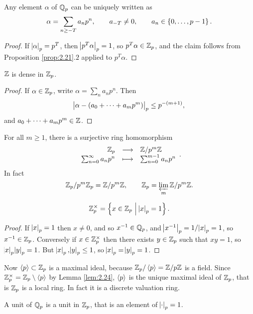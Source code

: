 \begin{corollary}
Any element $ \alpha $ of $ \mathbb{Q}_p $ can be uniquely written as
$$ \alpha = \sum_{n \ge -T} a_np^n, \qquad a_{-T} \ne 0, \qquad a_n \in \cbr{0, \dots, p - 1}. $$
\end{corollary}

\begin{proof}
If $ \abs{\alpha}_p = p^T $, then $ \abs{p^T\alpha}_p = 1 $, so $ p^T\alpha \in \mathbb{Z}_p $, and the claim follows from Proposition \ref{prop:2.21}.$ 2 $ applied to $ p^T\alpha $.
\end{proof}

\begin{corollary}
$ \mathbb{Z} $ is dense in $ \mathbb{Z}_p $.
\end{corollary}

\begin{proof}
If $ \alpha \in \mathbb{Z}_p $, write $ \alpha = \sum_n a_np^n $. Then
$$ \abs{\alpha - \br{a_0 + \dots + a_mp^m}}_p \le p^{-\br{m + 1}}, $$
and $ a_0 + \dots + a_mp^m \in \mathbb{Z} $.
\end{proof}

\pagebreak

For all $ m \ge 1 $, there is a surjective ring homomorphism
$$ \function{\ZZ_p}{\ZZ / p^m\ZZ}{\sum_{n = 0}^\infty a_np^n}{\sum_{n = 0}^{m - 1} a_np^n}. $$
In fact
$$ \mathbb{Z}_p / p^m\mathbb{Z}_p = \mathbb{Z} / p^m\mathbb{Z}, \qquad \mathbb{Z}_p = \varprojlim_m \mathbb{Z} / p^m\mathbb{Z}. $$

\begin{lemma}
\label{lem:2.24}
$$ \ZZ_p^\times = \cbr{x \in \ZZ_p \st \abs{x}_p = 1}. $$
\end{lemma}

\begin{proof}
If $ \abs{x}_p = 1 $ then $ x \ne 0 $, and so $ x^{-1} \in \mathbb{Q}_p $, and $ \abs{x^{-1}}_p = 1 / \abs{x}_p = 1 $, so $ x^{-1} \in \mathbb{Z}_p $. Conversely if $ x \in \mathbb{Z}_p^\times $ then there exists $ y \in \mathbb{Z}_p $ such that $ xy = 1 $, so $ \abs{x}_p\abs{y}_p = 1 $. But $ \abs{x}_p, \abs{y}_p \le 1 $, so $ \abs{x}_p = \abs{y}_p = 1 $.
\end{proof}

Now $ \left\langle p \right\rangle \subset \mathbb{Z}_p $ is a maximal ideal, because $ \mathbb{Z}_p / \left\langle p \right\rangle = \mathbb{Z} / p\mathbb{Z} $ is a field. Since $ \mathbb{Z}_p^\times = \mathbb{Z}_p \setminus \left\langle p \right\rangle $ by Lemma \ref{lem:2.24}, $ \left\langle p \right\rangle $ is the unique maximal ideal of $ \mathbb{Z}_p $, that is $ \mathbb{Z}_p $ is a local ring. In fact it is a discrete valuation ring.

\begin{notation*}
A unit of $ \mathbb{Q}_p $ is a unit in $ \mathbb{Z}_p $, that is an element of $ \abs{\cdot}_p = 1 $.
\end{notation*}

